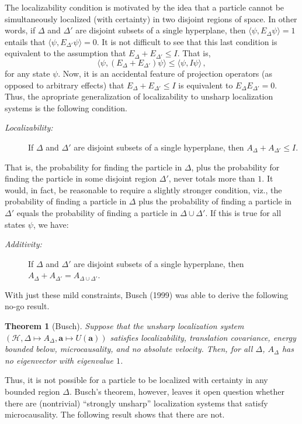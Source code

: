 \documentclass[11pt]{article}
\newtheorem*{thm*}{Theorem}
\theoremstyle{remark}
\newcommand{\hil}[1]{\mathcal{#1}}
\begin{document}
The localizability condition is motivated by the idea that a particle
cannot be simultaneously localized (with certainty) in two disjoint
regions of space.  In other words, if $\Delta$ and $\Delta '$ are
disjoint subsets of a single hyperplane, then $\langle \psi
,E_{\Delta}\psi \rangle =1$ entails that $\langle \psi ,E_{\Delta
  '}\psi \rangle =0$.  It is not difficult to see that this last
condition is equivalent to the assumption that $E_{\Delta}+E_{\Delta
  '}\leq I$.  That is, \begin{equation} \langle \psi
  ,(E_{\Delta}+E_{\Delta '})\psi \rangle \leq \langle \psi ,I\psi
  \rangle \, ,\end{equation} for any state $\psi$.  Now, it is an
accidental feature of projection operators (as opposed to arbitrary
effects) that $E_{\Delta}+E_{\Delta '}\leq I$ is equivalent to
$E_{\Delta}E_{\Delta '}=0$.  Thus, the apropriate generalization of
localizability to unsharp localization systems is the following
condition.
\begin{description}
\item[{\it Localizability:}] If $\Delta$ and $\Delta '$ are disjoint
  subsets of a single hyperplane, then \newline \mbox{$A_{\Delta}+A_{\Delta
      '}\leq I$}.
\end{description}
That is, the probability for finding the particle in $\Delta$, plus
the probability for finding the particle in some disjoint region
$\Delta '$, never totals more than $1$.  It would, in fact, be
reasonable to require a slightly stronger condition, viz., the
probability of finding a particle in $\Delta$ plus the probability of
finding a particle in $\Delta '$ equals the probability of finding a
particle in $\Delta \cup \Delta'$.  If this is true for all states
$\psi$, we have:
\begin{description}
\item[{\it Additivity:}] If $\Delta$ and $\Delta '$ are disjoint
  subsets of a single hyperplane, then \newline
  \mbox{$A_{\Delta}+A_{\Delta '}=A_{\Delta \cup \Delta '}$}.
\end{description}

With just these mild constraints, Busch (1999) was able to derive the
following no-go result.
\begin{thm*}[Busch] Suppose that the unsharp localization system 
  $(\hil{H},\Delta \mapsto A_{\Delta},\mathbf{a}\mapsto
  U(\mathbf{a}))$ satisfies localizability, translation covariance,
  energy bounded below, microcausality, and no absolute velocity.
  Then, for all $\Delta$, $A_{\Delta}$ has no eigenvector with
  eigenvalue $1$.
\end{thm*}
Thus, it is not possible for a particle to be localized with certainty
in any bounded region $\Delta$.  Busch's theorem, however, leaves it
open question whether there are (nontrivial) ``strongly unsharp''
localization systems that satisfy microcausality.  The following
result shows that there are not.
\end{document}
